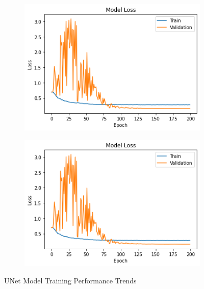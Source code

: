 \vspace{-\parskip}
\begin{figure}[H]
        \begin{subfigure}[b]{0.5\textwidth}
                \includegraphics[width=\linewidth]{Images/UNetAcc.png}
        \end{subfigure}%
        \begin{subfigure}[b]{0.5\textwidth}
                \includegraphics[width=\linewidth]{Images/UNetLoss.png}
        \end{subfigure}%
        \caption{UNet Model Training Performance Trends}\label{fig:unetModelTraining}
\end{figure}

